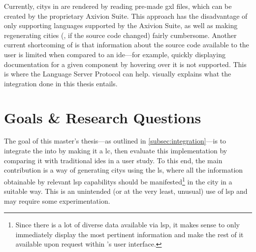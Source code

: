 \documentclass[../thesis]{subfiles}
\begin{document}
Currently, \glspl{city} in \SEE{} are rendered by reading pre-made \gls{gxl} files, which can be created by the proprietary Axivion Suite.
This approach has the disadvantage of only supporting languages supported by the Axivion Suite, as well as making regenerating cities (\eg, if the source code changed) fairly cumbersome.
Another current shortcoming of \SEE{} is that information about the source code available to the user is limited when compared to an \gls{ide}---for example, quickly displaying documentation for a given component by hovering over it is not supported.
This is where the Language Server Protocol can help.
 visually explains what the integration done in this thesis entails.


%

\section{Goals \& Research Questions}\label{sec:goals}
The goal of this master's thesis---as outlined in \cref{subsec:integration}---is to integrate the  into \SEE{} by making it a \gls{lc}, then evaluate this implementation by comparing it with traditional \glspl{ide} in a user study.
To this end, the main contribution is a way of generating \glspl{city} using the \gls{ls}, where all the information obtainable by relevant \gls{lsp} \glspl{capability} should be manifested\footnote{
	Since there is a lot of diverse data available via \gls{lsp}, it makes sense to only immediately display the most pertinent information and make the rest of it available upon request within \SEE{}'s user interface.
} in the city in a suitable way.
This is an unintended (or at the very least, unusual) use of \gls{lsp} and may require some experimentation.
\end{document}
